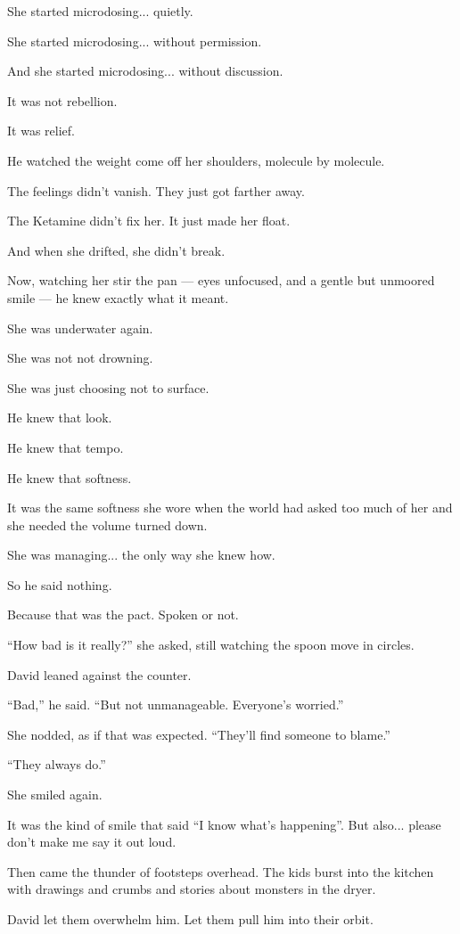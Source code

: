 She started microdosing... quietly. 

She started microdosing... without permission.

And she started microdosing... without discussion. 

It was not rebellion.

It was relief.

He watched the weight come off her shoulders, molecule by molecule.

The feelings didn’t vanish. 
They just got farther away.

The Ketamine didn’t fix her. 
It just made her float.

And when she drifted, she didn’t break.

Now, watching her stir the pan --- eyes unfocused, and a gentle but unmoored smile --- 
he knew exactly what it meant.

She was underwater again.

She was not not drowning.

She was just choosing not to surface.

He knew that look. 

He knew that tempo. 

He knew that softness.

It was the same softness she wore when the world had asked too much of her and she 
needed the volume turned down.

She was managing... the only way she knew how.

So he said nothing.

Because that was the pact.
Spoken or not.

``How bad is it really?'' she asked, still watching the spoon move in circles.

David leaned against the counter.

``Bad,'' he said. ``But not unmanageable. Everyone’s worried.''

She nodded, as if that was expected. ``They’ll find someone to blame.''

``They always do.''

She smiled again.

It was the kind of smile that said ``I know what's happening''.
But also... please don’t make me say it out loud.

Then came the thunder of footsteps overhead. The kids burst into the kitchen with drawings and crumbs 
and stories about monsters in the dryer.

David let them overwhelm him. Let them pull him into their orbit.

